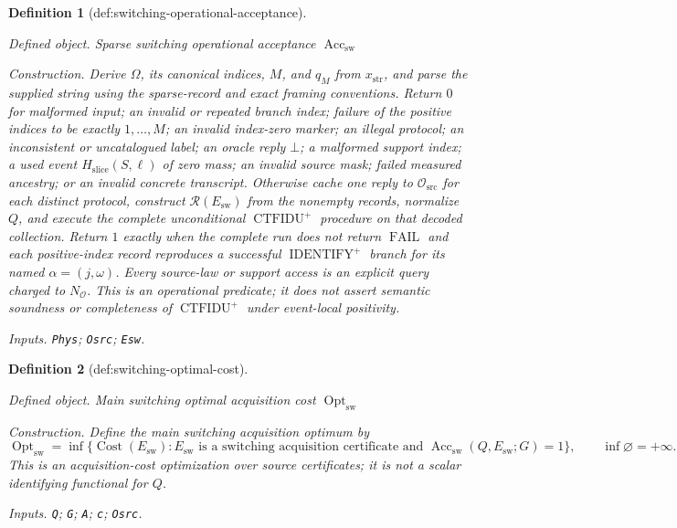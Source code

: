 \documentclass{article}
\newtheorem{definition}{Definition}
\begin{document}
\begin{definition}[def:switching-operational-acceptance]\label{def:switching-operational-acceptance}
\par\smallskip\noindent\emph{Defined object.} Sparse switching operational acceptance \(\operatorname{Acc}_{\mathrm{sw}}\)
\par\smallskip\noindent\emph{Construction.} Derive \(\Omega\), its canonical indices, \(M\), and \(q_M\) from \(x_{\mathrm{str}}\), and parse the supplied string using the sparse-record and exact framing conventions.  Return \(0\) for malformed input; an invalid or repeated branch index; failure of the positive indices to be exactly \(1,\ldots,M\); an invalid index-zero marker; an illegal protocol; an inconsistent or uncatalogued label; an oracle reply \(\bot\); a malformed support index; a used event \(H_{\mathrm{slice}}(S,\ell)\) of zero mass; an invalid source mask; failed measured ancestry; or an invalid concrete transcript.  Otherwise cache one reply to \(\mathcal O_{\mathrm{src}}\) for each distinct protocol, construct \(\mathcal R(E_{\mathrm{sw}})\) from the nonempty records, normalize \(Q\), and execute the complete unconditional \(\operatorname{CTFIDU}^{+}\) procedure on that decoded collection.  Return \(1\) exactly when the complete run does not return \(\operatorname{FAIL}\) and each positive-index record reproduces a successful \(\operatorname{IDENTIFY}^{+}\) branch for its named \(\alpha=(j,\omega)\).  Every source-law or support access is an explicit query charged to \(N_{\mathcal O}\).  This is an operational predicate; it does not assert semantic soundness or completeness of \(\operatorname{CTFIDU}^{+}\) under event-local positivity.
\par\smallskip\noindent\emph{Inputs.} \texttt{Phys}; \texttt{Osrc}; \texttt{Esw}.
\end{definition}

\begin{definition}[def:switching-optimal-cost]\label{def:switching-optimal-cost}
\par\smallskip\noindent\emph{Defined object.} Main switching optimal acquisition cost \(\operatorname{Opt}_{\mathrm{sw}}\)
\par\smallskip\noindent\emph{Construction.} Define the main switching acquisition optimum by
\[
 \operatorname{Opt}_{\mathrm{sw}}
 =\inf\{\operatorname{Cost}(E_{\mathrm{sw}}):
          E_{\mathrm{sw}}\text{ is a switching acquisition certificate and }
          \operatorname{Acc}_{\mathrm{sw}}(Q,E_{\mathrm{sw}};G)=1\},
 \qquad \inf\varnothing=+\infty.
\]
This is an acquisition-cost optimization over source certificates; it is not a scalar identifying functional for \(Q\).
\par\smallskip\noindent\emph{Inputs.} \texttt{Q}; \texttt{G}; \texttt{A}; \texttt{c}; \texttt{Osrc}.
\end{definition}
\end{document}
